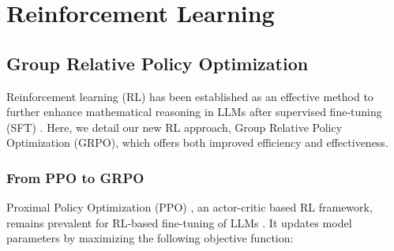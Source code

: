 \section{Reinforcement Learning}

\subsection{Group Relative Policy Optimization} Reinforcement learning (RL) has been established as an effective method to further enhance mathematical reasoning in LLMs after supervised fine-tuning (SFT) \citep{wang2023math,wizardmath}. Here, we detail our new RL approach, Group Relative Policy Optimization (GRPO), which offers both improved efficiency and effectiveness.

\subsubsection{From PPO to GRPO} Proximal Policy Optimization (PPO) \citep{schulman2017proximal}, an actor-critic based RL framework, remains prevalent for RL-based fine-tuning of LLMs \citep{ouyang2022training}. It updates model parameters by maximizing the following objective function:

